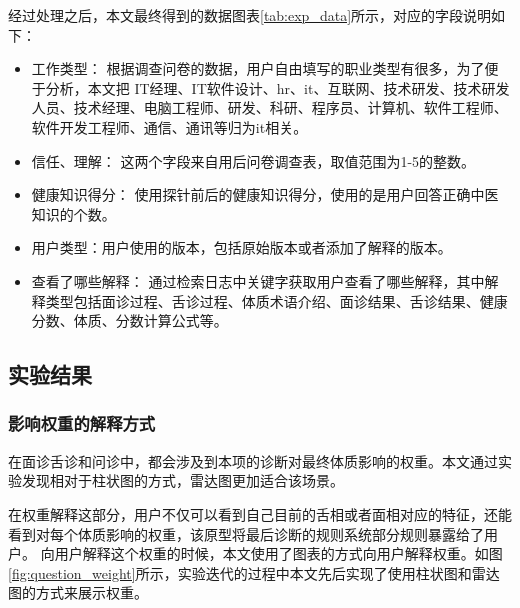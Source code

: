 经过处理之后，本文最终得到的数据图表\ref{tab:exp_data}所示，对应的字段说明如下：
\begin{itemize}
  \item 工作类型： 根据调查问卷的数据，用户自由填写的职业类型有很多，为了便于分析，本文把 IT经理、IT软件设计、hr、it、互联网、技术研发、技术研发人员、技术经理、电脑工程师、研发、科研、程序员、计算机、软件工程师、软件开发工程师、通信、通讯等归为it相关。

  \item  信任、理解： 这两个字段来自用后问卷调查表，取值范围为1-5的整数。

  \item  健康知识得分： 使用探针前后的健康知识得分，使用的是用户回答正确中医知识的个数。

  \item  用户类型：用户使用的版本，包括原始版本或者添加了解释的版本。

  \item  查看了哪些解释： 通过检索日志中关键字获取用户查看了哪些解释，其中解释类型包括面诊过程、舌诊过程、体质术语介绍、面诊结果、舌诊结果、健康分数、体质、分数计算公式等。
\end{itemize}

\subsection{实验结果}

\subsubsection{影响权重的解释方式}
在面诊舌诊和问诊中，都会涉及到本项的诊断对最终体质影响的权重。本文通过实验发现相对于柱状图的方式，雷达图更加适合该场景。

在权重解释这部分，用户不仅可以看到自己目前的舌相或者面相对应的特征，还能看到对每个体质影响的权重，该原型将最后诊断的规则系统部分规则暴露给了用户。
向用户解释这个权重的时候，本文使用了图表的方式向用户解释权重。如图\ref{fig:question_weight}所示，实验迭代的过程中本文先后实现了使用柱状图和雷达图的方式来展示权重。

